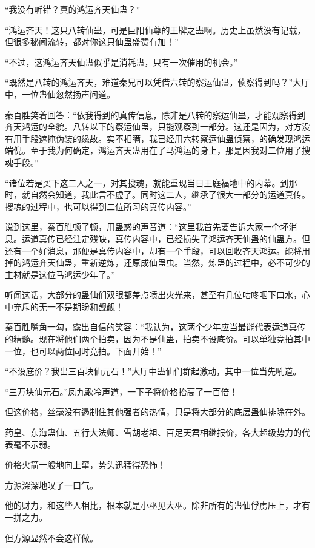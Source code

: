 \begin{this_body}
“我没有听错？真的鸿运齐天仙蛊？”

“鸿运齐天！这只八转仙蛊，可是巨阳仙尊的王牌之蛊啊。历史上虽然没有记载，但很多秘闻流转，都对你这只仙蛊盛赞有加！”

“不过，这鸿运齐天仙蛊似乎是消耗蛊，只有一次催用的机会。”

“既然是八转的鸿运齐天，难道秦兄可以凭借六转的察运仙蛊，侦察得到吗？”大厅中，一位蛊仙忽然扬声问道。

秦百胜笑着回答：“依我得到的真传信息，除非是八转的察运仙蛊，才能观察得到齐天鸿运的全貌。八转以下的察运仙蛊，只能观察到一部分。这还是因为，对方没有用手段遮掩伪装的缘故。实不相瞒，我已经用六转察运仙蛊侦察，的确发现鸿运端倪。至于我为何确定，鸿运齐天蛊用在了马鸿运的身上，那是因我对二位用了搜魂手段。”

“诸位若是买下这二人之一，对其搜魂，就能重现当日王庭福地中的内幕。到那时，就自然会知道，我此言不虚了。同时这二人，继承了很大一部分的运道真传。搜魂的过程中，也可以得到二位所习的真传内容。”

说到这里，秦百胜顿了顿，用蛊惑的声音道：“这里我首先要告诉大家一个坏消息。运道真传已经注定残缺，真传内容中，已经损失了鸿运齐天仙蛊的仙蛊方。但还有一个好消息，那便是真传内容中，却有一个手段，可以回收齐天鸿运。能将用掉的鸿运齐天仙蛊，重新逆炼，还原成仙蛊虫。当然，炼蛊的过程中，必不可少的主材就是这位马鸿运少年了。”

听闻这话，大部分的蛊仙们双眼都差点喷出火光来，甚至有几位咕咚咽下口水，心中充斥的无一不是期盼和觊觎！

秦百胜嘴角一勾，露出自信的笑容：“我认为，这两个少年应当最能代表运道真传的精髓。现在将他们两个拍卖，因为不是仙蛊，拍卖不设底价。可以单独竞拍其中一位，也可以两位同时竞拍。下面开始！”

“不设底价？我出三百块仙元石！”大厅中蛊仙们群起激动，其中一位当先吼道。

“三万块仙元石。”凤九歌冷声道，一下子将价格抬高了一百倍！

但这价格，丝毫没有遏制住其他强者的热情，只是将大部分的底层蛊仙排除在外。

药皇、东海蛊仙、五行大法师、雪胡老祖、百足天君相继报价，各大超级势力的代表毫不示弱。

价格火箭一般地向上窜，势头迅猛得恐怖！

方源深深地叹了一口气。

他的财力，和这些人相比，根本就是小巫见大巫。除非所有的蛊仙俘虏压上，才有一拼之力。

但方源显然不会这样做。


\end{this_body}
